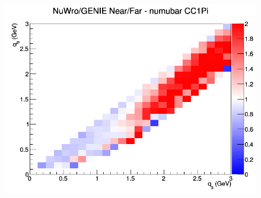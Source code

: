\begin{figure}[h]
\endminipage
{}
\includegraphics[width=\linewidth]{q0_q3/nominal/ratios/CC1Pi_NuWro_GENIE_numubar_NF_q3_q0.png}
\endminipage
\newline
\end{figure}
\clearpage
